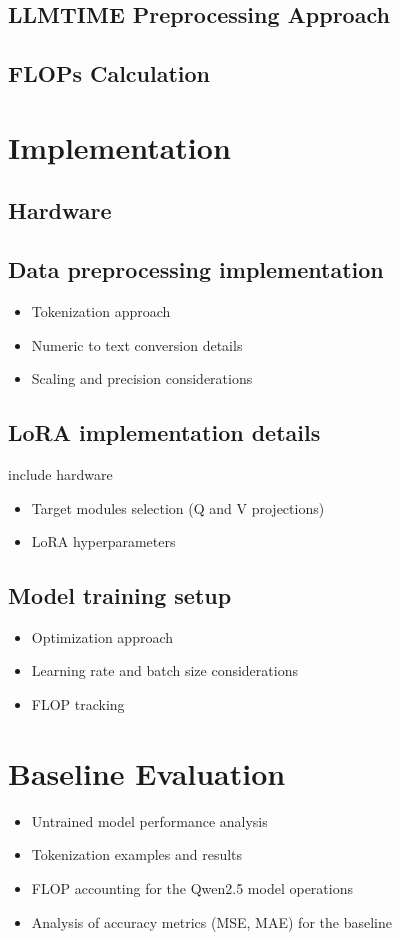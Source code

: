 \documentclass{article}
\begin{document}
\subsection*{LLMTIME Preprocessing Approach}

\subsection*{FLOPs Calculation}

\section*{Implementation}
\subsection*{Hardware}
\subsection*{Data preprocessing implementation}
\begin{itemize}
    \item Tokenization approach
    \item Numeric to text conversion details
    \item Scaling and precision considerations
\end{itemize}
\subsection*{LoRA implementation details}
include hardware
\begin{itemize}
    \item Target modules selection (Q and V projections)
    \item LoRA hyperparameters
\end{itemize}
\subsection*{Model training setup}
\begin{itemize}
    \item Optimization approach
    \item Learning rate and batch size considerations
    \item FLOP tracking
\end{itemize}

\section*{Baseline Evaluation}
\begin{itemize}
    \item Untrained model performance analysis
    \item Tokenization examples and results
    \item FLOP accounting for the Qwen2.5 model operations
    \item Analysis of accuracy metrics (MSE, MAE) for the baseline
\end{itemize}
\end{document}
